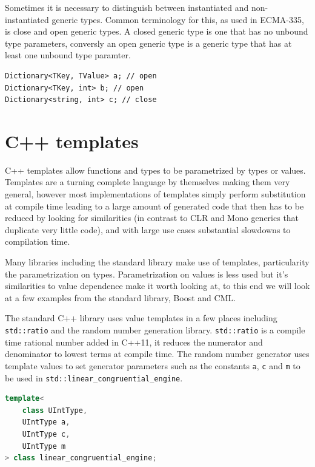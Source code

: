 \documentclass[english]{report}
\begin{document}
Sometimes it is necessary to distinguish between instantiated and
non-instantiated generic types. Common terminology for this, as used
in ECMA-335, is close and open generic types. A closed generic type
is one that has no unbound type parameters, conversly an open generic
type is a generic type that has at least one unbound type paramter.

\begin{lstlisting}[caption={Open and closed type in C\# syntax},keywordstyle={\color{blue}},language=sharpc]
Dictionary<TKey, TValue> a; // open
Dictionary<TKey, int> b; // open
Dictionary<string, int> c; // close
\end{lstlisting}



\section{C++ templates\label{sec:Cpp-templates}}

C++ templates allow functions and types to be parametrized by types
or values. Templates are a turning complete language by themselves
making them very general, however most implementations of templates
simply perform substitution at compile time leading to a large amount
of generated code that then has to be reduced by looking for similarities
(in contrast to CLR and Mono generics that duplicate very little code),
and with large use cases substantial slowdowns to compilation time.

Many libraries including the standard library make use of templates,
particularity the parametrization on types. Parametrization on values
is less used but it's similarities to value dependence make it worth
looking at, to this end we will look at a few examples from the standard
library, Boost\cite{boost} and CML\cite{cmldev}. 

The standard C++ library uses value templates in a few places including
\texttt{std::ratio} and the random number generation library. \texttt{std::ratio}
is a compile time rational number added in C++11, it reduces the numerator
and denominator to lowest terms at compile time. The random number
generator uses template values to set generator parameters such as
the constants \texttt{a}, \texttt{c} and \texttt{m} to be used in
\texttt{std::linear\_congruential\_engine}.

\begin{lstlisting}[keywordstyle={\color{blue}},language={C++}]
template<
	class UIntType, 
	UIntType a, 
	UIntType c, 
	UIntType m 
> class linear_congruential_engine;
\end{lstlisting}
\end{document}
